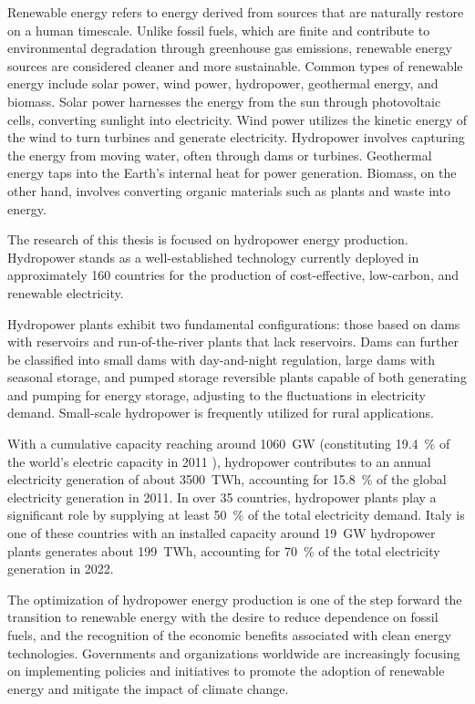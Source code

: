 Renewable energy refers to energy derived from sources that are naturally restore on a human timescale. Unlike fossil fuels, which are finite and contribute to environmental degradation through greenhouse gas emissions, renewable energy sources are considered cleaner and more sustainable. Common types of renewable energy include solar power, wind power, hydropower, geothermal energy, and biomass. 
Solar power harnesses the energy from the sun through photovoltaic cells, converting sunlight into electricity. Wind power utilizes the kinetic energy of the wind to turn turbines and generate electricity. Hydropower involves capturing the energy from moving water, often through dams or turbines. Geothermal energy taps into the Earth's internal heat for power generation. Biomass, on the other hand, involves converting organic materials such as plants and waste into energy.

The research of this thesis is focused on hydropower energy production. Hydropower stands as a well-established technology currently deployed in approximately 160 countries for the production of cost-effective, low-carbon, and renewable electricity. 

Hydropower plants exhibit two fundamental configurations: those based on dams with reservoirs and run-of-the-river plants that lack reservoirs. Dams can further be classified into small dams with day-and-night regulation, large dams with seasonal storage, and pumped storage reversible plants capable of both generating and pumping for energy storage, adjusting to the fluctuations in electricity demand. Small-scale hydropower is frequently utilized for rural applications. 

With a cumulative capacity reaching around \SI{1060}{GW} (constituting \SI{19.4}{\%} of the world's electric capacity in 2011 ), hydropower contributes to an annual electricity generation of about \SI{3500}{TWh}, accounting for \SI{15.8}{\%} of the global electricity generation in 2011. In over 35 countries, hydropower plants play a significant role by supplying at least \SI{50}{\%} of the total electricity demand. Italy is one of these countries with an installed capacity around \SI{19}{GW} hydropower plants generates about \SI{199}{TWh}, accounting for \SI{70}{\%} of the total electricity generation in 2022. 

The optimization of hydropower energy production is one of the step forward the transition to renewable energy with the desire to reduce dependence on fossil fuels, and the recognition of the economic benefits associated with clean energy technologies.  Governments and organizations worldwide are increasingly focusing on implementing policies and initiatives to promote the adoption of renewable energy and mitigate the impact of climate change.

